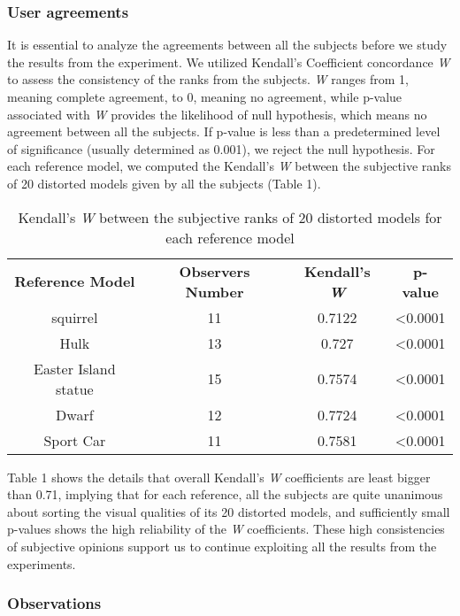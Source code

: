 \subsubsection{User agreements}
It is essential to analyze the agreements between all the subjects before we study the results from the experiment.  We utilized Kendall’s Coefficient concordance \textit{W} \cite{Kendall_1940} to assess the consistency of the ranks from the subjects.  \textit{W} ranges from 1, meaning complete agreement, to 0, meaning no agreement, while p-value associated with \textit{W} provides the likelihood of null hypothesis, which means no agreement between all the subjects. If p-value is less than a predetermined level of significance (usually determined as 0.001), we reject the null hypothesis. For each reference model, we computed the Kendall’s \textit{W} between the subjective ranks of 20 distorted models given by all the subjects (Table 1).\\
\begin{table} 
    \begin{tabular}{ c c c c }
        \textbf{Reference Model} & \textbf{Observers Number} & \textbf{Kendall's \textit{W}} & \textbf{p-value} \\ 
        squirrel & 11 & 0.7122 & <0.0001 \\ 
        Hulk & 13 & 0.727 & <0.0001 \\ 
        Easter Island statue & 15 & 0.7574 & <0.0001 \\ 
        Dwarf & 12 & 0.7724 & <0.0001 \\ 
        Sport Car & 11 & 0.7581 & <0.0001 \\ 
    \end{tabular} 
    \caption{Kendall’s \textit{W} between the subjective ranks of 20 distorted models for each reference model} 
\end{table}
Table 1 shows the details that overall Kendall’s \textit{W} coefficients are least bigger than 0.71, implying that for each reference, all the subjects are quite unanimous about sorting the visual qualities of its 20 distorted models, and sufficiently small p-values shows the high reliability of the \textit{W} coefficients. These high consistencies of subjective opinions support us to continue exploiting all the results from the experiments.\\
\subsubsection{Observations}


